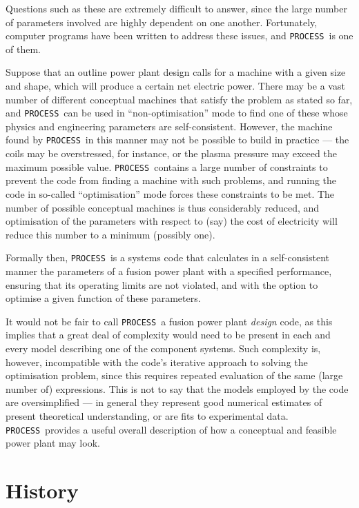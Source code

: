 \documentclass[11pt,a4paper]{report}
\newcommand{\process}{\mbox{\texttt{PROCESS}}}
\begin{document}
Questions such as these are extremely difficult to answer, since the large
number of parameters involved are highly dependent on one another.
Fortunately, computer programs have been written to address these issues, and
\process\ is one of them.

Suppose that an outline power plant design calls for a machine with a given
size and shape, which will produce a certain net electric power.  There may be
a vast number of different conceptual machines that satisfy the problem as
stated so far, and \process\ can be used in ``non-optimisation'' mode to find
one of these whose physics and engineering parameters are
self-consistent. However, the machine found by \process\ in this manner may
not be possible to build in practice --- the coils may be overstressed, for
instance, or the plasma pressure may exceed the maximum possible
value. \process\ contains a large number of constraints to prevent the code
from finding a machine with such problems, and running the code in so-called
``optimisation'' mode forces these constraints to be met. The number of
possible conceptual machines is thus considerably reduced, and optimisation of
the parameters with respect to (say) the cost of electricity will reduce this
number to a minimum (possibly one).

Formally then, \process\ is a systems code that calculates in a
self-consistent manner the parameters of a fusion power plant with a specified
performance, ensuring that its operating limits are not violated, and with the
option to optimise a given function of these parameters.

It would not be fair to call \process\ a fusion power plant \textit{design}\/
code, as this implies that a great deal of complexity would need to be present
in each and every model describing one of the component systems. Such
complexity is, however, incompatible with the code's iterative approach to
solving the optimisation problem, since this requires repeated evaluation of
the same (large number of) expressions. This is not to say that the models
employed by the code are oversimplified --- in general they represent good
numerical estimates of present theoretical understanding, or are fits to
experimental data. \process\ provides a useful overall description of how a
conceptual and feasible power plant may look.

\section{History}
\end{document}
